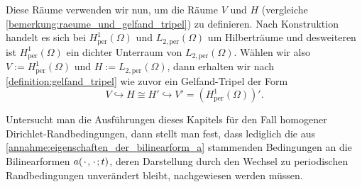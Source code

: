 \documentclass[../main.tex]{subfiles}
\begin{document}
Diese Räume verwenden wir nun, um die Räume $V$ und $H$ (vergleiche \cref{bemerkung:raeume_und_gelfand_tripel}) zu definieren.
Nach Konstruktion handelt es sich bei $H^{1}_{\mathrm{per}}(\Omega)$ und $L_{2,\mathrm{per}}(\Omega)$ um Hilberträume und desweiteren ist $H^{1}_{\mathrm{per}}(\Omega)$ ein dichter Unterraum von $L_{2,\mathrm{per}}(\Omega)$.
Wählen wir also $V := H^{1}_{\mathrm{per}}(\Omega)$ und $H := L_{2,\mathrm{per}}(\Omega)$, dann erhalten wir nach \cref{definition:gelfand_tripel} wie zuvor ein Gelfand-Tripel der Form
\begin{equation}
    V \hookrightarrow H \cong H' \hookrightarrow V' = (H^{1}_{\mathrm{per}}(\Omega))'.
\end{equation}

Untersucht man die Ausführungen dieses Kapitels für den Fall homogener Dirichlet-Randbedingungen, dann stellt man fest, dass lediglich die aus \cref{annahme:eigenschaften_der_bilinearform_a} stammenden Bedingungen an die Bilinearformen $a({\mkern2mu\cdot\mkern2mu}, {\mkern2mu\cdot\mkern2mu}; t)$, deren Darstellung durch den Wechsel zu periodischen Randbedingungen unverändert bleibt, nachgewiesen werden müssen.
\end{document}
